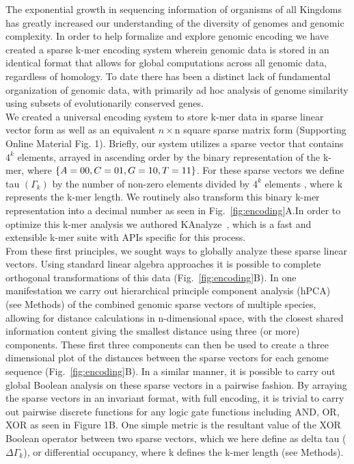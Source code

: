 \documentclass[12pt]{article}
\newcommand{\kmer}{k-mer\xspace}
\begin{document}
The exponential growth in sequencing information of organisms of all Kingdoms has greatly increased our understanding of the diversity of genomes and genomic complexity. In order to help formalize and explore genomic encoding we have created a sparse k-mer encoding system wherein genomic data is stored in an identical format that allows for global computations across all genomic data, regardless of homology. To date there has been a distinct lack of fundamental organization of genomic data, with primarily ad hoc analysis of genome similarity using subsets of evolutionarily conserved genes.\\
We created a universal encoding system to store k-mer data in sparse linear vector form as well as an equivalent $n \times $n square sparse matrix form (Supporting Online Material Fig. 1). Briefly, our system utilizes a sparse vector that contains ${4^k}$ elements, arrayed in ascending order by the binary representation of the k-mer, where $\left\{ {A = 00,{\rm{ }}C = 01,{\rm{ }}G = 10,{\rm{ }}T = 11} \right\}$. For these sparse vectors we define tau $({\Gamma _k})$ by the number of non-zero elements divided by ${4^k}$ elements , where k represents the k-mer length. We routinely also transform this binary k-mer representation into a decimal number as seen in Fig.~\ref{fig:encoding}A.In order to optimize this k-mer analysis we authored KAnalyze~\cite{Audano:2014aa}, which is a fast and extensible \kmer suite with APIs specific for this process.\\
From these first principles, we sought ways to globally analyze these sparse linear vectors. Using standard linear algebra approaches it is possible to complete orthogonal transformations of this data (Fig.~\ref{fig:encoding}B). In one manifestation we carry out hierarchical principle component analysis (hPCA)~\cite{Peterson:2002aa} (see Methods) of the combined genomic sparse vectors of multiple species, allowing for distance calculations in n-dimensional space, with the closest shared information content giving the smallest distance using three (or more) components. These first three components can then be used to create a three dimensional plot of the distances between the sparse vectors for each genome sequence (Fig.~\ref{fig:encoding}B). In a similar manner, it is possible to carry out global Boolean analysis on these sparse vectors in a pairwise fashion. By arraying the sparse vectors in an invariant format, with full encoding, it is trivial to carry out pairwise discrete functions for any logic gate functions including {AND, OR, XOR} as seen in Figure 1B. One simple metric is the resultant value of the XOR Boolean operator between two sparse vectors, which we here define as delta tau ($\Delta {\Gamma _k}$), or differential occupancy, where k defines the k-mer length (see Methods).
\end{document}
